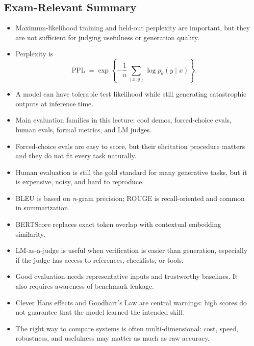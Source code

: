 \documentclass[11pt]{article}
\begin{document}
\subsection{Exam-Relevant Summary}
\begin{itemize}
    \item Maximum-likelihood training and held-out perplexity are important, but they are not sufficient for judging usefulness or generation quality.
    \item Perplexity is
    \[
    \operatorname{PPL} = \exp\left\{-\frac{1}{n}\sum_{(x,y)} \log p_\theta(y \mid x)\right\}.
    \]
    \item A model can have tolerable test likelihood while still generating catastrophic outputs at inference time.
    \item Main evaluation families in this lecture: cool demos, forced-choice evals, human evals, formal metrics, and LM judges.
    \item Forced-choice evals are easy to score, but their elicitation procedure matters and they do not fit every task naturally.
    \item Human evaluation is still the gold standard for many generative tasks, but it is expensive, noisy, and hard to reproduce.
    \item BLEU is based on \emph{n}-gram precision; ROUGE is recall-oriented and common in summarization.
    \item BERTScore replaces exact token overlap with contextual embedding similarity.
    \item LM-as-a-judge is useful when verification is easier than generation, especially if the judge has access to references, checklists, or tools.
    \item Good evaluation needs representative inputs and trustworthy baselines. It also requires awareness of benchmark leakage.
    \item Clever Hans effects and Goodhart's Law are central warnings: high scores do not guarantee that the model learned the intended skill.
    \item The right way to compare systems is often multi-dimensional: cost, speed, robustness, and usefulness may matter as much as raw accuracy.
\end{itemize}
\end{document}
